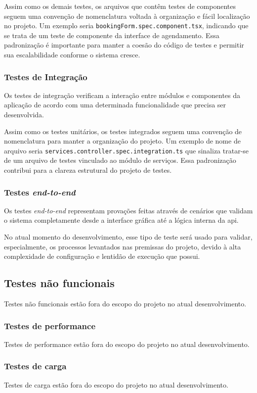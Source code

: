 Assim como os demais testes, os arquivos que contêm testes de componentes seguem uma convenção de nomenclatura voltada à organização e fácil localização no projeto. Um exemplo seria \texttt{bookingForm.\allowbreak spec.\allowbreak component.\allowbreak tsx}, indicando que se trata de um teste de componente da interface de agendamento. Essa padronização é importante para manter a coesão do código de testes e permitir sua escalabilidade conforme o sistema cresce.

\subsubsection{Testes de Integração}
Os testes de integração verificam a interação entre módulos e componentes da aplicação de acordo com uma determinada funcionalidade que precisa ser desenvolvida.

Assim como os testes unitários, os testes integrados seguem uma convenção de nomenclatura para manter a organização do projeto. Um exemplo de nome de arquivo seria \texttt{services.\allowbreak controller.\allowbreak spec.\allowbreak integration.ts} que sinaliza tratar-se de um arquivo de testes vinculado ao módulo de serviços. Essa padronização contribui para a clareza estrutural do projeto de testes.


\subsubsection{Testes \textit{end-to-end}}
Os testes \textit{end-to-end} representam provações feitas através de cenários que validam o sistema completamente desde a interface gráfica até a lógica interna da \gls{api}.

No atual momento do desenvolvimento, esse tipo de teste será usado para validar, especialmente, os processos levantados nas premissas do projeto, devido à alta complexidade de configuração e lentidão de execução que possui.


\subsection{Testes não funcionais}
Testes não funcionais estão fora do escopo do projeto no atual desenvolvimento.
\subsubsection{Testes de performance}
Testes de performance estão fora do escopo do projeto no atual desenvolvimento.
\subsubsection{Testes de carga}
Testes de carga estão fora do escopo do projeto no atual desenvolvimento.
